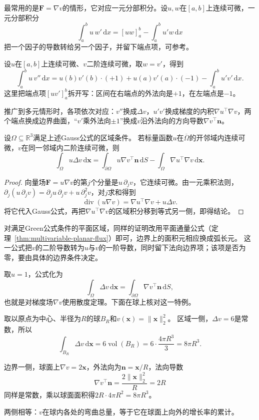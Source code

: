 最常用的是$\bm F=\nabla v$的情形，它对应一元分部积分。设$u,w$在$[a,b]$上连续可微，一元分部积分
\[
 \int_a^bu\,w'\,\mathrm dx=[uw]_a^b-\int_a^bu'w\,\mathrm dx
\]
把一个因子的导数转给另一个因子，并留下端点项，可参考。

设$u$在$[a,b]$上连续可微、$v$二阶连续可微，取$w=v'$，得到
\[
 \int_a^bu\,v''\,\mathrm dx
 =u(b)v'(b)\cdot(+1)+u(a)v'(a)\cdot(-1)-\int_a^bu'v'\,\mathrm dx.
\]
这里把端点项$[uv']_a^b$拆开写：区间在右端点的外法向是$+1$，在左端点是$-1$。

推广到多元情形时，各项依次对应：$v''$换成$\Delta v$，$u'v'$换成梯度的内积$\nabla u^\top\nabla v$，两个端点换成边界曲面，“$v'$乘外法向$\pm1$”换成$v$沿外法向的方向导数$\nabla v^\top\bm n$。
\begin{theorem}[多元分部积分]
\label{thm:multivariable-integration-by-parts}
设$\Omega\subseteq\mathbb R^3$满足上述Gauss公式的区域条件。
若标量函数$u$在$\overline\Omega$的开邻域内连续可微，$v$在同一邻域内二阶连续可微，则
\begin{equation}
 \int_\Omega u\Delta v\,\mathrm d\bm x
 =\int_{\partial\Omega}u\nabla v^\top\bm n\,\mathrm dS
  -\int_\Omega\nabla u^\top\nabla v\,\mathrm d\bm x.
 \label{eq:multivariable-integration-by-parts}
\end{equation}
\end{theorem}
\begin{proof}
向量场$\bm F=u\nabla v$的第$j$个分量是$u\,\partial_jv$，它连续可微。由一元乘积法则，
$\partial_j(u\,\partial_jv)=\partial_ju\,\partial_jv+u\,\partial_j^2v$，对$j$求和得到
\[
 \operatorname{div}(u\nabla v)
 =\nabla u^\top\nabla v+u\Delta v.
\]
将它代入Gauss公式，再把$\nabla u^\top\nabla v$的区域积分移到等式另一侧，即得结论。
\end{proof}
对满足Green公式条件的平面区域，同样的证明改用平面通量公式（定理~\ref{thm:multivariable-planar-flux}）即可，边界上的面积元相应换成弧长元。
这一公式把$v$的二阶导数转为$u$与$v$的一阶导数，同时留下法向边界项；该项是否为零，要由具体的边界条件决定。

取$u=1$，公式化为
\[
 \int_\Omega\Delta v\,\mathrm d\bm x=\int_{\partial\Omega}\nabla v^\top\bm n\,\mathrm dS,
\]
也就是对梯度场$\nabla v$使用散度定理。下面在球上核对这一特例。
\begin{example}[球上平方范数的Laplace积分]
取以原点为中心、半径为$R$的球$B_R$和$v(\bm x)=\lVert\bm x\rVert_2^2$。
区域一侧，$\Delta v=6$是常数，所以
\[
 \int_{B_R}\Delta v\,\mathrm d\bm x=6\operatorname{vol}(B_R)=6\cdot\frac{4\pi R^3}3=8\pi R^3.
\]

边界一侧，球面上$\nabla v=2\bm x$，外法向为$\bm n=\bm x/R$，法向导数
\[
 \nabla v^\top\bm n=\frac{2\lVert\bm x\rVert_2^2}R=2R
\]
同样是常数，乘以球面面积得$2R\cdot4\pi R^2=8\pi R^3$。

两侧相等：$v$在球内各处的弯曲总量，等于它在球面上向外的增长率的累计。
\end{example}

